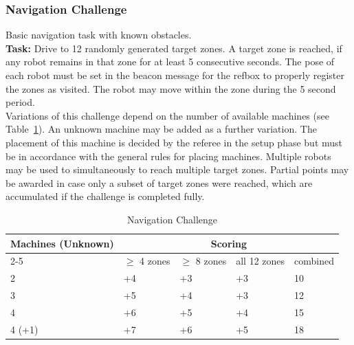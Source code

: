 \documentclass[12pt,twoside]{article}
\newcommand{\reftab}[1]{Table~\ref{#1}}
\begin{document}
\subsubsection{Navigation Challenge}\label{sec:challenge-navigation}
Basic navigation task with known obstacles.\\
\textbf{Task:} Drive to 12 randomly generated target zones. A target zone is
reached, if any robot remains in that zone for at least 5 consecutive seconds.
The pose of each robot must be set in the beacon message
for the \ac{refbox} to properly register the zones as visited.
The robot may move within the zone during the 5 second period.\\
Variations of this challenge depend on the number of available machines
(see \reftab{tab:challenge-navigation}). An unknown machine may be
added as a further variation. The placement of this machine is decided by the
referee in the setup phase but must be in accordance with the general rules for
placing machines.
Multiple robots may be used to simultaneously to reach multiple target zones.
Partial points may be awarded in case only a subset of target zones were
reached, which are accumulated if the challenge is completed fully.

\begin{table}[!htb]
 \centering
 \begin{tabular}{l|l|l|l|l}
  \multirow{2}{*}{Machines (Unknown)}
  & \multicolumn{4}{c}{Scoring} \\\cline{2-5}
	& $\geq$ 4 zones  & $\geq$ 8 zones & all 12 zones  & combined \\\hline\hline
	 2 & +4 & +3 & +3 & 10 \\
	 3 & +5 & +4 & +3 & 12 \\
	 4 & +6 & +5 & +4 & 15 \\
	 4 (+1) & +7 & +6 & +5 & 18 \\
 \end{tabular}
 \caption{Navigation Challenge}
 \label{tab:challenge-navigation}
\end{table}
\end{document}
